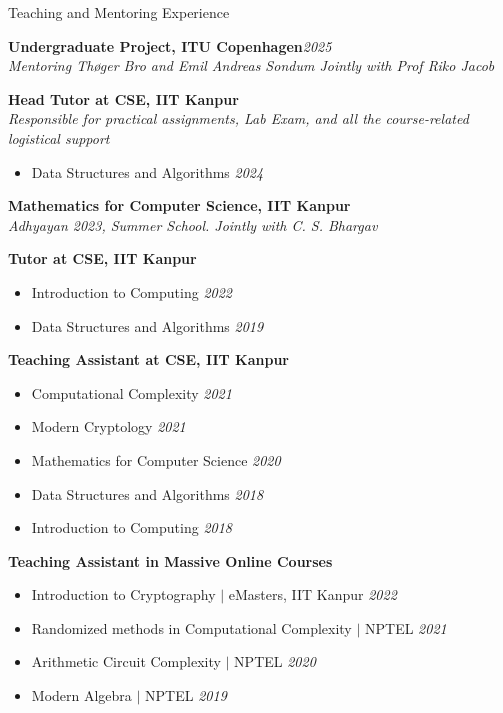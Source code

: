 \documentclass{resume} %
\begin{document}
\begin{rSection}{Teaching and Mentoring Experience}
  \item \textbf{Undergraduate Project, ITU Copenhagen}\hfill {\em 2025}\\
  {\em Mentoring Th\o{}ger Bro and Emil Andreas Sondum Jointly with Prof Riko Jacob}
  \item \textbf{Head Tutor at CSE, IIT Kanpur}\\
  {\em Responsible for practical assignments, Lab Exam, and all the course-related logistical support}
  \begin{itemize}
    \item Data Structures and Algorithms \hfill {\em 2024}
  \end{itemize}

  \item \textbf{Mathematics for Computer Science, IIT Kanpur}\\
  {\em Adhyayan 2023, Summer School. Jointly with C. S. Bhargav}

  \item \textbf{Tutor at CSE, IIT Kanpur}
  \begin{itemize}
    \item Introduction to Computing \hfill {\em 2022}
    \item Data Structures and Algorithms \hfill {\em 2019}
  \end{itemize}
  
  \item \textbf{Teaching Assistant at CSE, IIT Kanpur}
  \begin{itemize}
    \item Computational Complexity \hfill {\em 2021}
    \item Modern Cryptology \hfill {\em 2021} 
    \item Mathematics for Computer Science \hfill {\em 2020}
    \item Data Structures and Algorithms \hfill {\em 2018} 
    \item Introduction to Computing \hfill {\em 2018}
  
  \end{itemize}
  
  \item \textbf{Teaching Assistant in Massive Online Courses}
  \begin{itemize}
    \item Introduction to Cryptography \(|\) eMasters, IIT Kanpur \hfill {\em 2022}
    \item Randomized methods in Computational Complexity \(|\) NPTEL \hfill {\em 2021}
    \item Arithmetic Circuit Complexity \(|\) NPTEL \hfill {\em 2020}
    \item Modern Algebra \(|\) NPTEL \hfill {\em 2019}
  
  \end{itemize}
  
\end{rSection}
\end{document}
